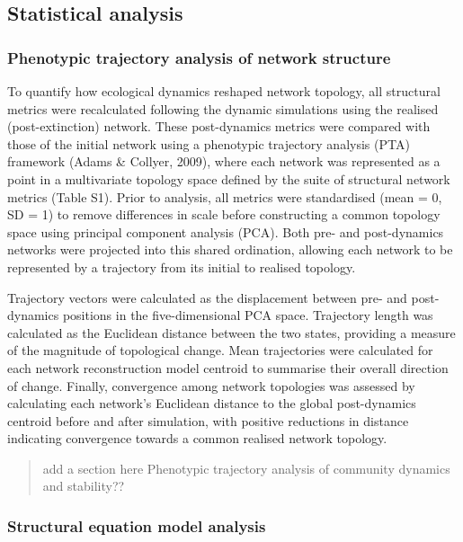 \documentclass[
]{article}
\begin{document}
\subsection{Statistical analysis}\label{statistical-analysis}

\subsubsection{Phenotypic trajectory analysis of network
structure}\label{phenotypic-trajectory-analysis-of-network-structure}

To quantify how ecological dynamics reshaped network topology, all
structural metrics were recalculated following the dynamic simulations
using the realised (post-extinction) network. These post-dynamics
metrics were compared with those of the initial network using a
phenotypic trajectory analysis (PTA) framework (Adams \& Collyer, 2009),
where each network was represented as a point in a multivariate topology
space defined by the suite of structural network metrics (Table S1).
Prior to analysis, all metrics were standardised (mean = 0, SD = 1) to
remove differences in scale before constructing a common topology space
using principal component analysis (PCA). Both pre- and post-dynamics
networks were projected into this shared ordination, allowing each
network to be represented by a trajectory from its initial to realised
topology.

Trajectory vectors were calculated as the displacement between pre- and
post-dynamics positions in the five-dimensional PCA space. Trajectory
length was calculated as the Euclidean distance between the two states,
providing a measure of the magnitude of topological change. Mean
trajectories were calculated for each network reconstruction model
centroid to summarise their overall direction of change. Finally,
convergence among network topologies was assessed by calculating each
network's Euclidean distance to the global post-dynamics centroid before
and after simulation, with positive reductions in distance indicating
convergence towards a common realised network topology.

\begin{quote}
add a section here Phenotypic trajectory analysis of community dynamics
and stability??
\end{quote}

\subsubsection{Structural equation model
analysis}\label{structural-equation-model-analysis}
\end{document}
